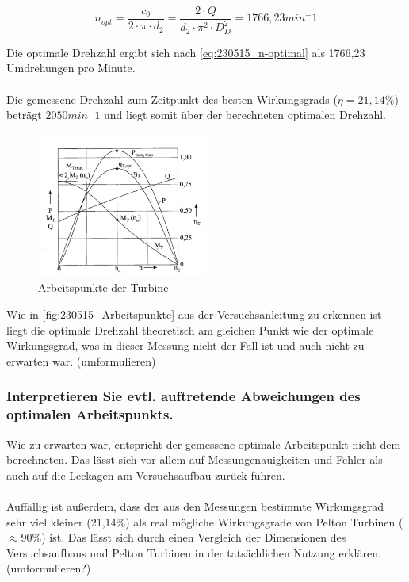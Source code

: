 \begin{equation}
 n_{opt}=\frac{c_{0}}{2 \cdot \pi \cdot d_{2}}=\frac{2 \cdot Q}{d_{2} \cdot \pi^2  \cdot D_{D}^2}=1766,23  min^-1
\label{eq:230515_n-optimal}
\end{equation}


 Die optimale Drehzahl ergibt sich nach \autoref{eq:230515_n-optimal} als 1766,23 Umdrehungen pro Minute.
\\\\
Die gemessene Drehzahl zum Zeitpunkt des besten Wirkungsgrads ($\eta=21,14\%$) beträgt $2050 min^-1$ und liegt somit über der berechneten optimalen Drehzahl. 

\begin{figure}[!ht]
		\centering
		\includegraphics[width=0.5\textwidth]{Abbildungen/Arbeitspunkte}
		\caption{Arbeitspunkte der Turbine}
		\label{fig:230515_Arbeitspunkte}
\end{figure}

Wie in \autoref{fig:230515_Arbeitspunkte} aus der Versuchsanleitung zu erkennen ist liegt die optimale Drehzahl theoretisch am gleichen Punkt wie der optimale Wirkungsgrad, was in dieser Messung nicht der Fall ist und auch nicht zu erwarten war.  (umformulieren) 


\subsubsection{Interpretieren Sie evtl. auftretende Abweichungen des optimalen Arbeitspunkts.}

Wie zu erwarten war, entspricht der gemessene optimale Arbeitspunkt nicht dem berechneten. Das lässt sich vor allem auf Messungenauigkeiten und Fehler als auch auf die Leckagen am Versuchsaufbau zurück führen. \\\\ Auffällig ist außerdem, dass der aus den Messungen bestimmte Wirkungsgrad sehr viel kleiner (21,14\%) als real mögliche Wirkungsgrade von Pelton Turbinen ($\approx90\%$) ist. Das lässt sich durch einen Vergleich der Dimensionen des Versuchsaufbaus und Pelton Turbinen in der tatsächlichen Nutzung erklären. (umformulieren?)


